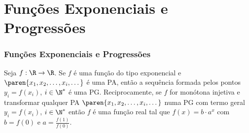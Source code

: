 \section{Funções Exponenciais e Progressões}
\begin{frame}
\frametitle{Funções Exponenciais e Progressões} 

\begin{proposicao}
Seja  $f: \R \to \R$. Se $f$ é uma função do tipo exponencial e
$\paren{x_1, x_2, \dots , x_i, \dots}$ é uma PA, então a sequência
formada pelos pontos $y_i = f(x_i)$, $i \in \N^{\ast}$ é uma PG.
Reciprocamente, se $f$ for monótona injetiva e transformar qualquer
PA $\paren{x_1, x_2, \dots , x_i, \dots}$ numa PG com termo geral
$y_i = f(x_i)$, $i \in \N^{\ast}$ então $f$ é uma função real tal
que $f(x) = b \cdot a^x$ com $b = f(0)$ e $a = \frac {f(1)} {f(0)}$.
\end{proposicao}

\end{frame}

